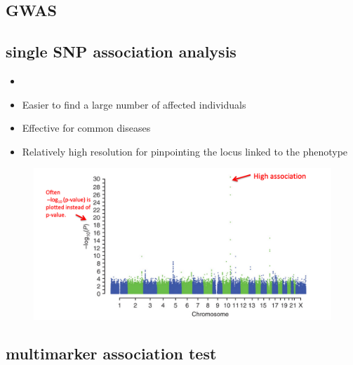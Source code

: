 \documentclass[font=12pt]{article}
\begin{document}
\subsection{GWAS}
\subsection{single SNP association analysis}
\begin{itemize}
	\item {}
	\item Easier to find a large number of affected individuals
	\item Effective for common diseases
	\item Relatively high resolution for pinpointing the locus linked to the phenotype
\end{itemize}
\begin{figure}[h!]
	\centering
	\includegraphics[width=0.5\linewidth]{"manhanttan plot"}
	\label{fig:manhanttan-plot}
\end{figure}
\subsection{multimarker association test}
\end{document}
